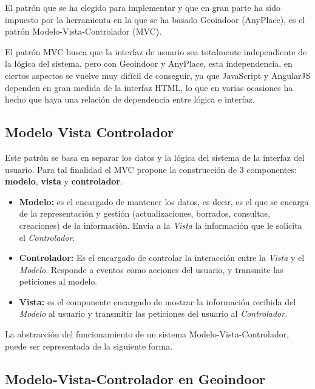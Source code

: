 El patrón que se ha elegido para implementar y que en gran parte ha sido impuesto por la herramienta en la que se ha basado Geoindoor (AnyPlace), es el patrón Modelo-Vista-Controlador (MVC).

El patrón MVC busca que la interfaz de usuario sea totalmente independiente de la lógica del sistema, pero con Geoindoor y AnyPlace, esta independencia, en ciertos aspectos se vuelve muy difícil de conseguir, ya que JavaScript y AngularJS dependen en gran medida de la interfaz HTML, lo que en varias ocasiones ha hecho que haya una relación de dependencia entre lógica e interfaz.

\subsection{Modelo Vista Controlador}

Este patrón se basa en separar los datos y la lógica del sistema de la interfaz del usuario. Para tal finalidad el MVC propone la construcción de 3 componentes: \textbf{modelo}, \textbf{vista} y \textbf{controlador}.

\begin{itemize}
	\item \textbf{Modelo:} es el encargado de mantener los datos, es decir, es el que se encarga de la representación y gestión (actualizaciones, borrados, consultas, creaciones) de la información. Envia a la \textit{Vista} la información que le solicita el \textit{Controlador}.
	\item \textbf{Controlador:} Es el encargado de controlar la interacción entre la \textit{Vista} y el \textit{Modelo}. Responde a eventos como acciones del usuario, y transmite las peticiones al modelo.
	\item \textbf{Vista:} es el componente encargado de mostrar la información recibida del \textit{Modelo} al usuario y transmitir las peticiones del usuario al \textit{Controlador}.
\end{itemize}


La abstracción del funcionamiento de un sistema Modelo-Vista-Controlador, puede ser representada de la siguiente forma.


\subsection{Modelo-Vista-Controlador en Geoindoor}

